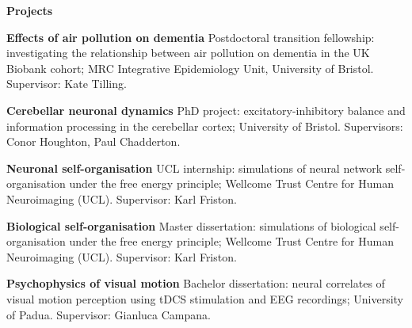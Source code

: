\documentclass[11pt,usenames, dvipsnames]{article}
\begin{document}
\vspace{1cm}

{\large \bfseries \color{color_64493} Projects}\newline
\vspace{1pt}

 {\bfseries Effects of air pollution on dementia}
\newline Postdoctoral transition fellowship: investigating the relationship between air pollution on dementia in the UK Biobank cohort; MRC Integrative Epidemiology Unit,
University of Bristol.
\newline Supervisor: Kate Tilling.

\vspace{7pt}

 {\bfseries Cerebellar neuronal dynamics}
\newline PhD project: excitatory-inhibitory balance and information processing in the cerebellar cortex; University of Bristol.
\newline Supervisors: Conor Houghton, Paul Chadderton.

\vspace{7pt}

 {\bfseries Neuronal self-organisation}
\newline UCL internship: simulations of neural network self-organisation under the free energy principle; Wellcome Trust Centre for Human Neuroimaging (UCL). 
\newline Supervisor: Karl Friston.

\vspace{7pt}

 {\bfseries Biological self-organisation}
\newline Master dissertation: simulations of biological self-organisation under the free energy principle; Wellcome Trust Centre for Human Neuroimaging (UCL).
\newline Supervisor: Karl Friston.

\vspace{7pt}

 {\bfseries Psychophysics of visual motion}
\newline Bachelor dissertation: neural correlates of visual motion perception using tDCS stimulation and EEG recordings; University of Padua.
\newline Supervisor: Gianluca Campana.
\end{document}
